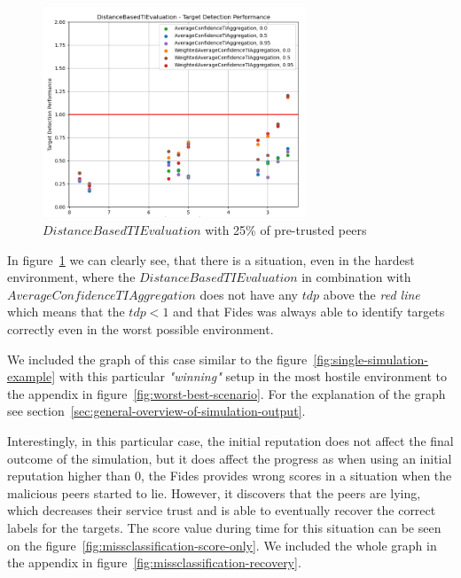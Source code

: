 \begin{figure}[h]
    \centering
    \includegraphics[width=0.7\textwidth]{assets/25_distance_detection_detail.png}
    \caption{$DistanceBasedTIEvaluation$ with 25\% of pre-trusted peers}
    \label{fig:distance-detection-detail-25}
\end{figure}

In figure~\ref{fig:distance-detection-detail-25} we can clearly see, that there is a situation, even in the hardest environment, where the $DistanceBasedTIEvaluation$ in combination with $AverageConfidenceTIAggregation$ does not have any $tdp$ above the \textit{red line} which means that the $tdp < 1$ and that Fides was always able to identify targets correctly even in the worst possible environment.

We included the graph of this case similar to the figure~\ref{fig:single-simulation-example} with this particular \textit{"winning"} setup in the most hostile environment to the appendix in figure~\ref{fig:worst-best-scenario}. For the explanation of the graph see section~\ref{sec:general-overview-of-simulation-output}.

Interestingly, in this particular case, the initial reputation does not affect the final outcome of the simulation, but it does affect the progress as when using an initial reputation higher than $0$, the Fides provides wrong scores in a situation when the malicious peers started to lie.
However, it discovers that the peers are lying, which decreases their service trust and is able to eventually recover the correct labels for the targets.
The score value during time for this situation can be seen on the figure~\ref{fig:missclassification-score-only}.
We included the whole graph in the appendix in figure~\ref{fig:missclassification-recovery}.

